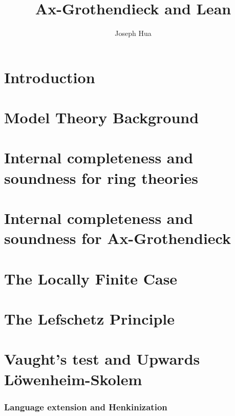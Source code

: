 \documentclass{article}
\newcommand{\<}{\langle}
\renewcommand{\>}{\rangle}
\theoremstyle{definitionstyle}
\theoremstyle{exercisestyle}
\theoremstyle{remarkstyle}
\begin{document}
\title{Ax-Grothendieck and Lean}
\author{Joseph Hua}
\maketitle

\tableofcontents

\newpage
\section{Introduction}


\section{Model Theory Background}


\section{Internal completeness and soundness for ring theories}


\section{Internal completeness and soundness
  for Ax-Grothendieck}


\section{The Locally Finite Case}


\section{The Lefschetz Principle}


\section{Vaught's test and Upwards L\"{o}wenheim-Skolem}


\subsubsection{Language extension and Henkinization}

\end{document}
